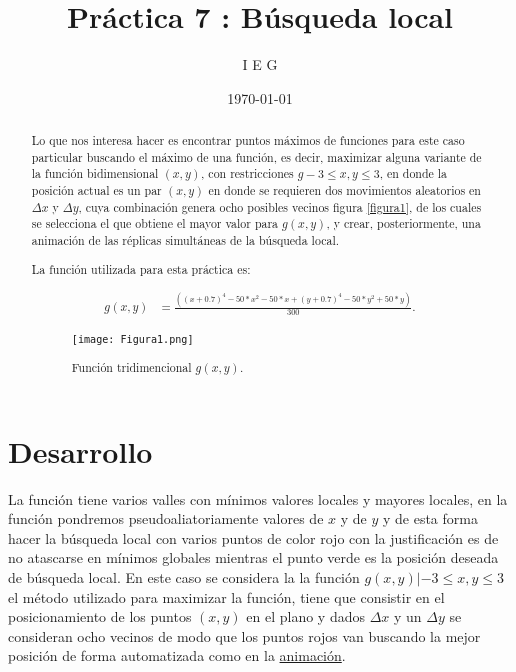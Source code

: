 \documentclass{article}
\author{I E G} %
\title{Práctica 7 : Búsqueda local} %
\date{\today}
\begin{document}

\maketitle %

\begin{abstract} %
Lo que nos interesa hacer es encontrar puntos máximos de funciones para este caso particular buscando el máximo de una función, es decir, maximizar \cite{elis7} alguna variante de la función bidimensional $(x,y)$, con restricciones $g−3\leq x,y \leq 3$, en donde la posición actual es un par $(x,y)$ en donde se requieren dos movimientos aleatorios en $\Delta x$ y $\Delta y$, cuya combinación genera ocho posibles vecinos figura \ref{figura1}, de los cuales se selecciona el que obtiene el mayor valor para $g(x,y)$, y crear, posteriormente, una animación de las réplicas simultáneas de la búsqueda local.

La función utilizada para esta práctica es:

\begin{align*}
g(x,y) &= \frac{((x + 0.7)^4 - 50 * x^2 - 50 * x + (y + 0.7)^4 - 50 * y^2 + 50 * y)}{300}.
\end{align*}

\begin{figure} [h!]%
    \centering
    \texttt{[image: Figura1.png]} %
    \caption{Función tridimencional $g(x,y)$.}
    \label{figura1}
\end{figure}

\end{abstract}


\section{Desarrollo}

La función tiene varios valles con mínimos valores locales y mayores locales, en la función pondremos pseudoaliatoriamente valores de $x$ y de $y$ y de esta forma hacer la búsqueda local con varios puntos de color rojo con la justificación es de no atascarse en mínimos globales mientras el punto verde es la posición deseada de búsqueda local.
En este caso se considera \cite{fab} la la función $g(x,y) | −3 \leq x,y \leq 3$ el método utilizado \cite{denis} para maximizar la función, tiene que consistir en el posicionamiento de los puntos $(x,y)$ en el plano y dados $\Delta x$ y un $\Delta y$ se consideran ocho vecinos de modo que los puntos rojos van buscando la mejor posición de forma automatizada como en la \href{https://github.com/IsaacEstrada159/simulacion/blob/master/p7/images/5/ezgif.com-gif-maker%20(11).gif}{animación}.
\end{document}
